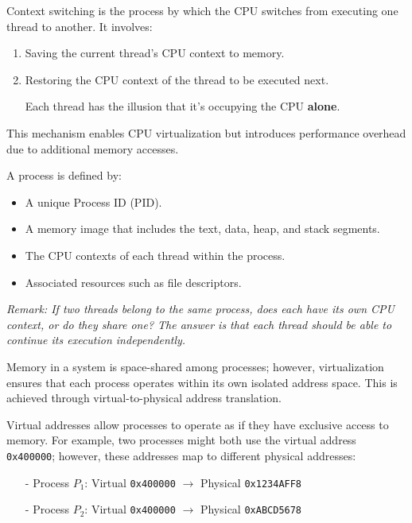 \begin{definition}
Context switching is the process by which the CPU switches from executing one thread to another. It involves:
\begin{enumerate}
    \item Saving the current thread's CPU context to memory.
    \item Restoring the CPU context of the thread to be executed next.
    \item[] Each thread has the illusion that it's occupying the CPU \textbf{alone}.
\end{enumerate}
This mechanism enables CPU virtualization but introduces performance overhead due to additional memory accesses.
\end{definition}
\vspace{10px}
\begin{definition}[Process]
A process is defined by:
\begin{itemize}
    \item A unique Process ID (PID).
    \item A memory image that includes the text, data, heap, and stack segments.
    \item The CPU contexts of each thread within the process.
    \item Associated resources such as file descriptors.
\end{itemize}
\end{definition}
\textit{Remark: If two threads belong to the same process, does each have its own CPU context, or do they share one? The answer is that each thread should be able to continue its execution independently.}
\vspace{10px}
\begin{definition}
Memory in a system is space-shared among processes; however, virtualization ensures that each process operates within its own isolated address space. This is achieved through virtual-to-physical address translation.
\end{definition}
\vspace{10px}
\begin{definition}
Virtual addresses allow processes to operate as if they have exclusive access to memory. For example, two processes might both use the virtual address \texttt{0x400000}; however, these addresses map to different physical addresses:
\begin{itemize}
  \item[-] Process \( P_1 \): Virtual \texttt{0x400000} \(\rightarrow\) Physical \texttt{0x1234AFF8}
  \item[-] Process \( P_2 \): Virtual \texttt{0x400000} \(\rightarrow\) Physical \texttt{0xABCD5678}
\end{itemize}
\end{definition}
